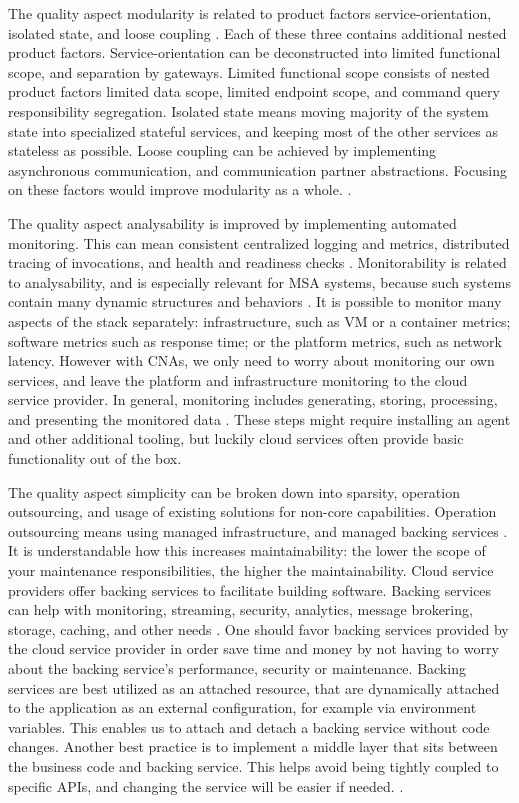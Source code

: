 \documentclass[utf8,english]{gradu3}
\begin{document}
The quality aspect modularity is related to product factors service-orientation,
isolated state, and loose coupling \parencite{Lichtenthaler2022}. Each of these
three contains additional nested product factors. Service-orientation can be
deconstructed into limited functional scope, and separation by gateways. Limited
functional scope consists of nested product factors limited data scope, limited
endpoint scope, and command query responsibility segregation. Isolated state
means moving majority of the system state into specialized stateful services,
and keeping most of the other services as stateless as possible. Loose coupling
can be achieved by implementing asynchronous communication, and communication
partner abstractions. Focusing on these factors would improve modularity as a
whole. \parencite{Lichtenthaler2022}.

The quality aspect analysability is improved by implementing automated
monitoring. This can mean consistent centralized logging and metrics,
distributed tracing of invocations, and health and readiness checks
\parencite{Lichtenthaler2022}. Monitorability is related to analysability, and is especially relevant for MSA
systems, because such systems contain many dynamic structures and behaviors
\parencite[13]{Li2021}. It is possible to monitor many aspects of the stack
separately: infrastructure, such as VM or a container metrics; software metrics
such as response time; or the platform metrics, such as network latency. However
with CNAs, we only need to worry about monitoring our own services, and leave
the platform and infrastructure monitoring to the cloud service provider. In
general, monitoring includes generating, storing, processing, and presenting the
monitored data \parencite[13]{Li2021}. These steps might require installing an
agent and other additional tooling, but luckily cloud services often provide
basic functionality out of the box.

The quality aspect simplicity can be broken down into sparsity, operation
outsourcing, and usage of existing solutions for non-core capabilities.
Operation outsourcing means using managed infrastructure, and managed backing
services \parencite{Lichtenthaler2022}. It is understandable how this increases
maintainability: the lower the scope of your maintenance responsibilities, the
higher the maintainability. Cloud service providers offer backing services to
facilitate building software. Backing services can help with monitoring,
streaming, security, analytics, message brokering, storage, caching, and other
needs \parencite{Microsoft2022-CNA}. One should favor backing services provided
by the cloud service provider in order save time and money by not having to
worry about the backing service's performance, security or maintenance. Backing
services are best utilized as an attached resource, that are dynamically
attached to the application as an external configuration, for example via
environment variables. This enables us to attach and detach a backing service
without code changes. Another best practice is to implement a middle layer that
sits between the business code and backing service. This helps avoid being
tightly coupled to specific APIs, and changing the service will be easier if
needed. \parencite{Microsoft2022-CNA}.
\end{document}
